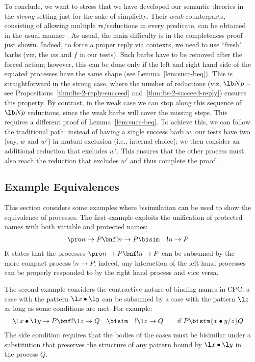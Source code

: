 \documentclass{LMCS}
\begin{document}
To conclude, we want to stress that we have developed our semantic theories
in the {\em strong} setting just for the sake of simplicity. Their {\em weak} counterparts,
consisting of allowing multiple $\tau$s/reductions in every predicate, can be obtained
in the usual manner \cite{milner.parrow.ea:calculus-mobile,milner.sangiorgi:barbed-bisimulation}.
As usual, the main difficulty is in the completeness proof just shown. Indeed, to force a proper
reply via contexts, we need to use ``fresh" barbs (viz, the $w$s and $f$ in our tests). Such barbs 
have to be removed after the forced action; however, this can be done only if the left and right
hand side of the equated processes have the same shape (see Lemma~\ref{lem:succ-beq}).
This is straightforward in the strong case, where the number of reductions (viz, $\lb N p$ --
see Propositions~\ref{thm:lts-2-reply-succeed} and~\ref{thm:lts-2-succeed-reply}) ensures this property. 
By contrast, in the weak case we can stop along this sequence of $\lb N p$ reductions, since the
weak barbs will cover the missing steps. This requires a different proof of Lemma~\ref{lem:succ-beq}.
To achieve this, we can follow the traditional path: instead of having a single success barb $w$,
our tests have two (say, $w$ and $w'$) in mutual exclusion (i.e., internal choice); we then 
consider an additional reduction that excludes $w'$. This ensures that the other process must also reach
the reduction that excludes $w'$ and thus complete the proof.


\subsection{Example Equivalences}
\label{subsec:examples}

This section considers some examples where bisimulation can be used to show the equivalence of processes.
The first example exploits the unification of protected names with both variable and protected names:
\begin{eqnarray*}
\pro n\to P\bnf !n\to P &\bisim& !n\to P
\end{eqnarray*}
It states that the processes $\pro n\to P\bnf !n\to P$ can be subsumed by the more compact process $!n\to P$;
indeed, any interaction of the left hand processes can be properly responded to by the right hand process and vice versa.

The second example considers the contractive nature of binding names in CPC:
a case with the pattern $\l x\bullet\l y$ can be subsumed by a case with the pattern $\l z$ as long as some conditions are met.
For example:
\begin{equation*}
\begin{array}{rcll}
\l x\bullet \l y\to P \bnf !\l z \to Q &\bisim& !\l z\to Q &
\quad \mbox{if $P\bisim \{x\bullet y/z\}Q$}
\end{array}
\end{equation*}
The side condition requires that the bodies of the cases must be bisimilar under a substitution that preserves the structure of any pattern bound by $\l x\bullet\l y$ in the process $Q$.
\end{document}
